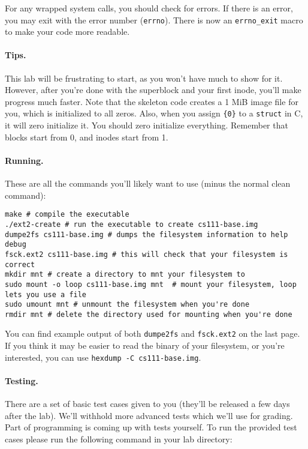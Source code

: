 For any wrapped system calls, you should check for errors.
If there is an error, you may exit with the error number (\texttt{errno}).
There is now an \texttt{errno\_exit} macro to make your code more readable.

\paragraph{Tips.}

This lab will be frustrating to start, as you won't have much to show for it.
However, after you're done with the superblock and your first inode, you'll
make progress much faster.
Note that the skeleton code creates a 1 MiB image file for you, which is
initialized to all zeros.
Also, when you assign \texttt{\{0\}} to a \texttt{struct} in C, it will
zero initialize it.
You should zero initialize everything.
Remember that blocks start from 0, and inodes start from 1.

\paragraph{Running.}

These are all the commands you'll likely want to use (minus the normal
clean command):

\begin{lstlisting}
make # compile the executable
./ext2-create # run the executable to create cs111-base.img
dumpe2fs cs111-base.img # dumps the filesystem information to help debug
fsck.ext2 cs111-base.img # this will check that your filesystem is correct
mkdir mnt # create a directory to mnt your filesystem to
sudo mount -o loop cs111-base.img mnt  # mount your filesystem, loop lets you use a file
sudo umount mnt # unmount the filesystem when you're done
rmdir mnt # delete the directory used for mounting when you're done
\end{lstlisting}

You can find example output of both \lstinline|dumpe2fs| and
\lstinline|fsck.ext2| on the last page.
If you think it may be easier to read the binary of your filesystem, or
you're interested, you can use \lstinline|hexdump -C cs111-base.img|.

\paragraph{Testing.}

There are a set of basic test cases given to you (they'll be released a few
days after the lab).
We'll withhold more advanced tests which we'll use for grading.
Part of programming is coming up with tests yourself.
To run the provided test cases please run the following command in your lab
directory:

